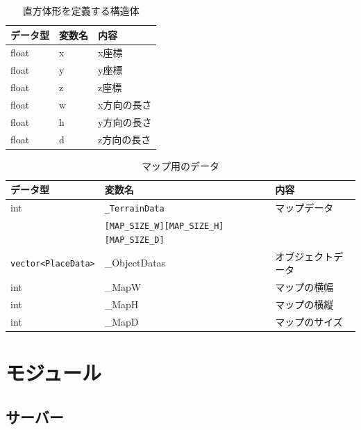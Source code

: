 \documentclass{jarticle}
\begin{document}
\begin{table}[h]
    \caption{直方体形を定義する構造体}
    \label{table:data4}
    \begin{center}
    \begin{tabular}{|l||l|l|}\hline
    データ型 & 変数名 & 内容　\\ \hline
    float & x & x座標 \\ \hline
    float & y & y座標 \\ \hline
    float & z & z座標 \\ \hline
    float & w & x方向の長さ \\ \hline
    float & h & y方向の長さ \\ \hline
    float & d & z方向の長さ \\ \hline
    \end{tabular}
    \end{center}
\end{table}
\begin{table}[h]
    \caption{マップ用のデータ}
    \label{table:data5}
    \centering
    \begin{tabular}{|l||l|l|}\hline
    データ型 & 変数名 & 内容 \\ \hline
    int & \verb+_TerrainData+  & マップデータ \\
    & \verb+[MAP_SIZE_W][MAP_SIZE_H][MAP_SIZE_D]+ & \\ \hline
    \verb+vector<PlaceData>+ & \_ObjectDatas & オブジェクトデータ \\ \hline
    int & \_MapW & マップの横幅 \\ \hline
    int & \_MapH & マップの横縦 \\ \hline
    int & \_MapD & マップのサイズ \\ \hline
    \end{tabular}
\end{table}

\section{モジュール}
\subsection{サーバー}
\end{document}
